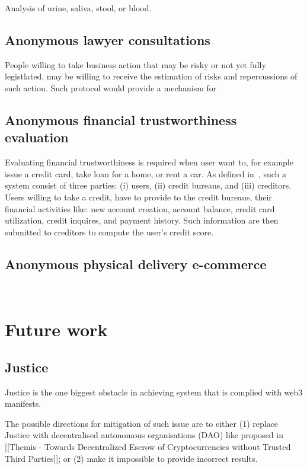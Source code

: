 \documentclass{article}
\begin{document}
Analysis of urine, saliva, stool, or blood. 

\subsection{Anonymous lawyer consultations}

People willing to take business action that may be risky or not yet fully legistlated, may be willing to receive the estimation of risks and repercussions of such action.
Such protocol would provide a mechanism for 


\subsection{Anonymous financial trustworthiness evaluation}

Evaluating financial trustworthiness is required when user want to, for example issue a credit card, take loan for a home, or rent a car. 
As defined in~\cite{lin2021efficient}, such a system consist of three parties: (i) users, (ii) credit bureaus, and (iii) creditors. Users willing to take a credit, have to provide to the credit bureaus, their financial activities like: new account creation, account balance, credit card utilization, credit inquires, and payment history. Such information are then submitted to creditors to compute the user's credit score. 

\subsection{Anonymous physical delivery e-commerce}
~\cite{birjoveanu2015anonymity}

\section{Future work}

\subsection{Justice}
Justice is the one biggest obstacle in achieving system that is complied with web3 manifests. 

The possible directions for mitigation of such issue are to either (1) replace Justice with decentralised autonomous organisations (DAO) like proposed in [[Themis - Towards Decentralized Escrow of Cryptocurrencies without Trusted Third Parties]]; or (2) make it impossible to provide incorrect results.
\end{document}
